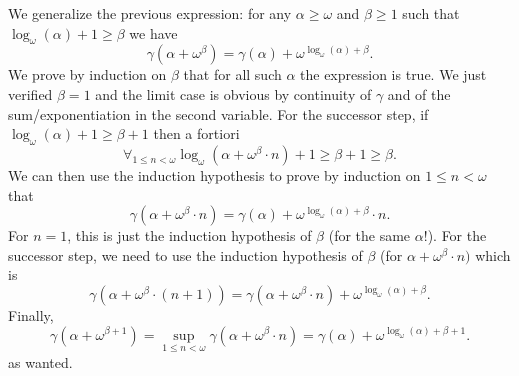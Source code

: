 We generalize the previous expression: for any \(\alpha \geq \omega\)
and \(\beta \geq 1\) such that \(\log_\omega(\alpha) + 1 \geq \beta\)
we have
\begin{equation*}
\gamma(\alpha+\omega^{\beta})=\gamma(\alpha)+\omega^{\log_{\omega}(\alpha)+\beta}.
\end{equation*}
We prove by induction on \(\beta\)
that for all such \(\alpha\) the expression is true. We just
verified \(\beta =1\) and the limit case is obvious by continuity
of \(\gamma\) and of the sum/exponentiation in the second variable. For
the successor step, if \(\log_\omega(\alpha) + 1 \geq \beta + 1\) then a
fortiori
\begin{equation*}
\forall_{1\leq n<\omega} \log_\omega(\alpha + \omega^\beta \cdot n) + 1
  \geq \beta + 1 \geq \beta.
\end{equation*}
We can then use the induction hypothesis
to prove by induction on \(1\leq n<\omega\) that
\begin{equation*}
\gamma(\alpha+{\omega^{\beta}\cdot n})
  = \gamma(\alpha)+\omega^{\log_{\omega}(\alpha)+\beta}\cdot n.
\end{equation*}
For \(n=1\), this is just the induction hypothesis
of \(\beta\) (for the same \(\alpha\)!). For the successor step, we need to
use the induction hypothesis of \(\beta\)
(for \(\alpha + \omega^\beta \cdot n)\)
which is
\begin{equation*}
\gamma(\alpha+{\omega^{\beta}\cdot{(n+1)}})
  = \gamma(\alpha+{\omega^{\beta} \cdot n})
     + \omega^{\log_{\omega}(\alpha)+\beta}.
\end{equation*}
Finally,
\begin{equation*}
\gamma(\alpha + \omega^{\beta+1})
  = {\sup_{1\leq n< \omega}{\gamma(\alpha+{\omega^{\beta}\cdot n})}}
  = \gamma(\alpha)+\omega^{\log_{\omega}(\alpha)+\beta+1}.
\end{equation*}
as wanted.

